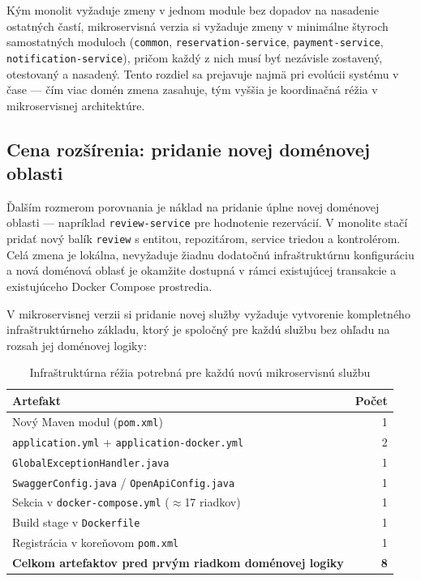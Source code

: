 Kým monolit vyžaduje zmeny v jednom module bez dopadov na nasadenie ostatných častí, mikroservisná verzia si vyžaduje zmeny v minimálne štyroch samostatných moduloch (\texttt{common}, \texttt{reservation-service}, \texttt{payment-service}, \texttt{notification-service}), pričom každý z nich musí byť nezávisle zostavený, otestovaný a nasadený. Tento rozdiel sa prejavuje najmä pri evolúcii systému v čase — čím viac domén zmena zasahuje, tým vyššia je koordinačná réžia v mikroservisnej architektúre.

\subsection*{Cena rozšírenia: pridanie novej doménovej oblasti}

Ďalším rozmerom porovnania je náklad na pridanie úplne novej doménovej oblasti — napríklad \texttt{review-service} pre hodnotenie rezervácií. V monolite stačí pridať nový balík \texttt{review} s entitou, repozitárom, service triedou a kontrolérom. Celá zmena je lokálna, nevyžaduje žiadnu dodatočnú infraštruktúrnu konfiguráciu a nová doménová oblasť je okamžite dostupná v rámci existujúcej transakcie a existujúceho Docker Compose prostredia.

V mikroservisnej verzii si pridanie novej služby vyžaduje vytvorenie kompletného infraštruktúrneho základu, ktorý je spoločný pre každú službu bez ohľadu na rozsah jej doménovej logiky:

\begin{table}[H]
\centering
\begin{tabular}{|l|r|}
\hline
\textbf{Artefakt} & \textbf{Počet} \\ \hline
Nový Maven modul (\texttt{pom.xml}) & 1 \\ \hline
\texttt{application.yml} + \texttt{application-docker.yml} & 2 \\ \hline
\texttt{GlobalExceptionHandler.java} & 1 \\ \hline
\texttt{SwaggerConfig.java} / \texttt{OpenApiConfig.java} & 1 \\ \hline
Sekcia v \texttt{docker-compose.yml} ($\approx$17 riadkov) & 1 \\ \hline
Build stage v \texttt{Dockerfile} & 1 \\ \hline
Registrácia v koreňovom \texttt{pom.xml} & 1 \\ \hline
\textbf{Celkom artefaktov pred prvým riadkom doménovej logiky} & \textbf{8} \\ \hline
\end{tabular}
\caption{Infraštruktúrna réžia potrebná pre každú novú mikroservisnú službu}
\label{tab:new-service-boilerplate}
\end{table}

